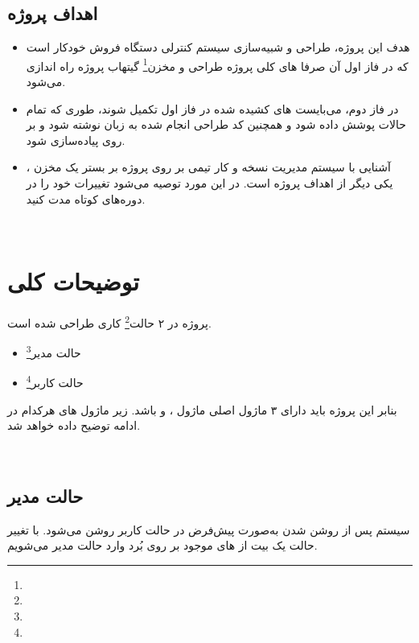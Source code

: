 \documentclass[]{article}
\begin{document}
\subsection*{{\titr اهداف پروژه}}
\begin{itemize}
	\item
	هدف این پروژه، طراحی و شبیه‌سازی سیستم کنترلی دستگاه فروش خودکار است که در فاز اول آن صرفا  های کلی پروژه طراحی و مخزن\footnote{} گیتهاب پروژه راه اندازی می‌شود. 
	
	\item 
	در فاز دوم، می‌بایست  های کشیده شده در فاز اول تکمیل شوند، طوری که تمام حالات پوشش داده شود و همچنین کد طراحی انجام شده به زبان  نوشته شود و بر روی  پیاده‌سازی شود.
	\item 
	آشنایی با سیستم مدیریت نسخه  و کار تیمی بر روی پروژه بر بستر یک مخزن ، یکی دیگر از اهداف پروژه است. در این مورد توصیه می‌شود تغییرات خود را در دوره‌های کوتاه مدت  کنید.
\end{itemize}



 \Large \textbf{\\
}


\section*{{\titr توضیحات کلی }}
\label{sec:detail}

پروژه در ۲ حالت\footnote{} کاری طراحی شده است.
\begin{itemize}
	\item حالت مدیر\footnote{}
	\item حالت کاربر\footnote{}
\end{itemize}

بنابر این پروژه باید دارای ۳ ماژول اصلی ماژول ،  و   باشد. زیر ماژول های هرکدام در ادامه توضیح داده خواهد شد.





\newpage
\Large \textbf{\\
}

\subsection*{{\titr حالت مدیر}} 
سیستم پس از روشن شدن به‌صورت پیش‌فرض در حالت کاربر روشن می‌شود. با تغییر حالت یک بیت از  های موجود بر روی بُرد وارد حالت مدیر می‌شویم.
\end{document}
